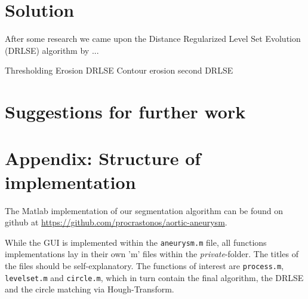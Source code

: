 \documentclass[a4paper]{scrartcl}
\begin{document}
\section*{Solution}

After some research we came upon the Distance Regularized Level Set Evolution
(DRLSE) algorithm by ...

Thresholding
Erosion
DRLSE
Contour erosion
second DRLSE

\section*{Suggestions for further work}

\section*{Appendix: Structure of implementation}

The Matlab implementation of our segmentation algorithm can be found on github
at \url{https://github.com/procrastonos/aortic-aneurysm}.

While the GUI is implemented within the \texttt{aneurysm.m} file, all functions
implementations lay in their own 'm' files within the \emph{private}-folder.
The titles of the files should be self-explanatory. The functions of interest
are \texttt{process.m}, \texttt{levelset.m} and \texttt{circle.m}, which in
turn contain the final algorithm, the DRLSE and the circle matching via
Hough-Transform.
\end{document}
